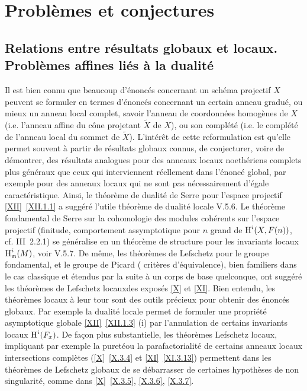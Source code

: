 \chapter{Probl\`emes et conjectures} \label{XIII}

\section[Relations entre r\'esultats globaux et locaux]
{Relations entre r\'esultats globaux et locaux. Probl\`emes affines li\'es \`a la dualit\'e} \label{XIII.1}

Il est bien connu que beaucoup d'\'enonc\'es concernant un sch\'ema
projectif $X$ peuvent se formuler en termes d'\'enonc\'es concernant
un certain anneau gradu\'e, ou mieux un anneau local complet,
\ignorespaces savoir l'anneau de coordonn\'ees homog\`enes
de $X$ (i.e. l'anneau affine du c\^{o}ne projetant $\tilde{X}$ de
$X$), ou son compl\'et\'e (i.e. le compl\'et\'e de l'anneau local du sommet
de $\tilde{X}$). L'int\'er\^et de cette reformulation est qu'elle
permet souvent \`a partir de r\'esultats globaux connus, de
conjecturer, voire de d\'emontrer, des r\'esultats analogues pour des
anneaux locaux noeth\'eriens complets plus g\'en\'eraux que ceux qui
interviennent r\'eellement dans l'\'enonc\'e global, par exemple pour
des anneaux locaux qui ne sont pas n\'ecessairement d'\'egale
caract\'eristique. Ainsi, le th\'eor\`eme de dualit\'e de Serre pour
l'espace projectif \ref{XII}~\ref{XII.1.1} a sugg\'er\'e l'utile
th\'eor\`eme de dualit\'e locale V.5.6. Le
th\'eor\`eme fondamental de Serre sur la cohomologie des
modules coh\'erents sur l'espace projectif (finitude,
comportement assymptotique pour $n$ grand de $\operatorname{H}^i(X,
F(n))$, {cf. \EGA III~2.2.1}) se g\'en\'eralise en un th\'eor\`eme de
structure pour les invariants locaux $\operatorname{H}^i_{\mathfrak{m}}(M)$, voir
V.5.7. De m\^eme, les th\'eor\`emes de
Lefschetz pour le groupe fondamental, et le groupe de Picard (\og
crit\`eres d'\'equivalence{\fg}), bien familiers dans le cas
classique et \'etendus par la suite \`a un corps de base quelconque,
ont sugg\'er\'e les th\'eor\`emes de Lefschetz \og locaux\fg des expos\'es
\ref{X} et \ref{XI}. Bien entendu, les th\'eor\`emes locaux \`a leur
tour sont des outils pr\'ecieux pour obtenir des \'enonc\'es globaux.
Par exemple la dualit\'e locale permet de formuler une propri\'et\'e
asymptotique globale \ref{XII}~\ref{XII.1.3} (i) par l'annulation
de certains invariants locaux $\operatorname{H}^i(F_x)$. De fa\c con plus
substantielle, les th\'eor\`emes Lefschetz locaux, impliquant par
exemple la \og puret\'e\fg ou la parafactorialit\'e de certains
anneaux locaux intersections compl\`etes (\ref{X}~\ref{X.3.4} et
\ref{XI}~\ref{XI.3.13}) permettent dans les th\'eor\`emes de
Lefschetz globaux de se d\'ebarrasser de certaines hypoth\`eses de
non singularit\'e, comme dans \ref{X}~\ref{X.3.5}, \ref{X.3.6},
\ref{X.3.7}.

